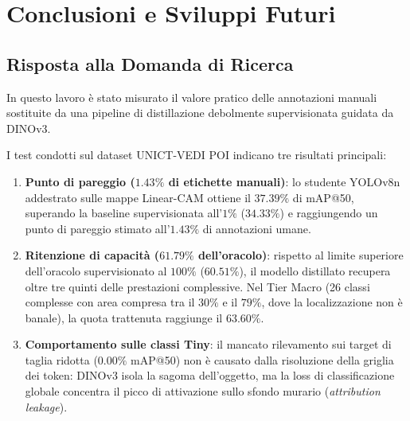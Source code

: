 \chapter{Conclusioni e Sviluppi Futuri}
\label{chap:conclusioni}

\section{Risposta alla Domanda di Ricerca}
\label{sec:conc_risposta}
In questo lavoro è stato misurato il valore pratico delle annotazioni manuali sostituite da una pipeline di distillazione debolmente supervisionata guidata da DINOv3.

I test condotti sul dataset UNICT-VEDI POI indicano tre risultati principali:
\begin{enumerate}\setlength{\itemsep}{1pt}\setlength{\parskip}{0pt}
    \item \textbf{Punto di pareggio ($1.43\%$ di etichette manuali)}: lo studente YOLOv8n addestrato sulle mappe Linear-CAM ottiene il $37.39\%$ di mAP@50, superando la baseline supervisionata all'$1\%$ ($34.33\%$) e raggiungendo un punto di pareggio stimato all'$1.43\%$ di annotazioni umane.
    \item \textbf{Ritenzione di capacità ($61.79\%$ dell'oracolo)}: rispetto al limite superiore dell'oracolo supervisionato al $100\%$ ($60.51\%$), il modello distillato recupera oltre tre quinti delle prestazioni complessive. Nel Tier Macro (26 classi complesse con area compresa tra il $30\%$ e il $79\%$, dove la localizzazione non è banale), la quota trattenuta raggiunge il $63.60\%$.
    \item \textbf{Comportamento sulle classi Tiny}: il mancato rilevamento sui target di taglia ridotta ($0.00\%$ mAP@50) non è causato dalla risoluzione della griglia dei token: DINOv3 isola la sagoma dell'oggetto, ma la loss di classificazione globale concentra il picco di attivazione sullo sfondo murario (\textit{attribution leakage}).
\end{enumerate}

